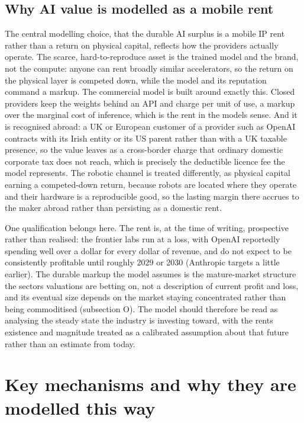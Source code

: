\documentclass[11pt]{article}
\begin{document}
\hypertarget{why-ai-value-is-modelled-as-a-mobile-rent}{%
\subsection{Why AI value is modelled as a mobile
rent}\label{why-ai-value-is-modelled-as-a-mobile-rent}}

The central modelling choice, that the durable AI surplus is a mobile IP
rent rather than a return on physical capital, reflects how the
providers actually operate. The scarce, hard-to-reproduce asset is the
trained model and the brand, not the compute: anyone can rent broadly
similar accelerators, so the return on the physical layer is competed
down, while the model and its reputation command a markup. The
commercial model is built around exactly this. Closed providers keep the
weights behind an API and charge per unit of use, a markup over the
marginal cost of inference, which is the rent in the
model\textquotesingle s sense. And it is recognised abroad: a UK or
European customer of a provider such as OpenAI contracts with its Irish
entity or its US parent rather than with a UK taxable presence, so the
value leaves as a cross-border charge that ordinary domestic corporate
tax does not reach, which is precisely the deductible licence fee the
model represents. The robotic channel is treated differently, as
physical capital earning a competed-down return, because robots are
located where they operate and their hardware is a reproducible good, so
the lasting margin there accrues to the maker abroad rather than
persisting as a domestic rent.

One qualification belongs here. The rent is, at the time of writing,
prospective rather than realised: the frontier labs run at a loss, with
OpenAI reportedly spending well over a dollar for every dollar of
revenue, and do not expect to be consistently profitable until roughly
2029 or 2030 (Anthropic targets a little earlier). The durable markup
the model assumes is the mature-market structure the
sector\textquotesingle s valuations are betting on, not a description of
current profit and loss, and its eventual size depends on the market
staying concentrated rather than being commoditised (subsection O). The
model should therefore be read as analysing the steady state the
industry is investing toward, with the rent\textquotesingle s existence
and magnitude treated as a calibrated assumption about that future
rather than an estimate from today.

\hypertarget{upgrades}{}
\hypertarget{key-mechanisms-and-why-they-are-modelled-this-way}{%
\section{Key mechanisms and why they are modelled this
way}\label{key-mechanisms-and-why-they-are-modelled-this-way}}
\end{document}
